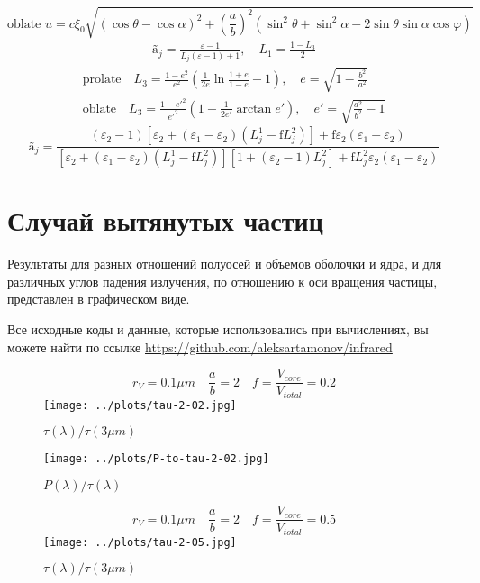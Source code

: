\documentclass[a4paper,10pt]{article}
\begin{document}
\begin{equation}
  \text{oblate    } u=c\xi_0\sqrt{(\cos\theta-\cos\alpha)^2+\left(\frac{a}{b}\right)^{2}(\sin^2\theta+\sin^2\alpha-2\sin\theta\sin\alpha\cos\varphi)} 
\end{equation}
\begin{eqnarray}
 \text{\~{a}}_j = \frac{\varepsilon-1}{L_j(\varepsilon-1)+1},\quad L_1=\frac{1-L_3}{2}
\end{eqnarray}
\begin{eqnarray}
  \text{prolate}\quad L_3 = \frac{1-e^2}{e^2}\left(\frac{1}{2e}\ln\frac{1+e}{1-e}-1\right),\quad e=\sqrt{1-\frac{b^2}{a^2}}\\
  \text{oblate}\quad L_3 = \frac{1-e'^2}{e'^2}\left(1 - \frac{1}{2e'}\arctan{e'}\right),\quad e'=\sqrt{\frac{a^2}{b^2}-1}
\end{eqnarray}
\begin{equation}
 \text{\~{a}}_j = \frac{(\varepsilon_2-1)[\varepsilon_2+(\varepsilon_1-\varepsilon_2)(L^{1}_{j} - \text{\~{f}}L^2_j)]
	    +\text{\~{f}}\varepsilon_2(\varepsilon_1-\varepsilon_2)}
	    {[\varepsilon_2+(\varepsilon_1-\varepsilon_2)(L^{1}_{j} - \text{\~{f}}L^2_j)][1+(\varepsilon_2-1)L^2_j]+
	    \text{\~{f}}L^2_j\varepsilon_2(\varepsilon_1-\varepsilon_2)} 
\end{equation}
\section{Случай вытянутых частиц}
\par
Результаты для разных отношений полуосей и объемов оболочки и ядра, и для различных углов падения излучения,
по отношению к оси вращения частицы, представлен в графическом виде.
\par Все исходные коды и данные, которые использовались при вычислениях, вы можете найти по ссылке \url{https://github.com/aleksartamonov/infrared}


\begin{figure}[p]

$$r_V = 0.1 \mu m \quad \frac{a}{b} = 2 \quad f=\frac{V_{core}}{V_{total}}=0.2$$
 \texttt{[image: ../plots/tau-2-02.jpg]}
 \caption{$\tau(\lambda)/\tau(3\mu m)$ }
\end{figure}

\begin{figure}[p]
 \texttt{[image: ../plots/P-to-tau-2-02.jpg]}
 \caption{$P(\lambda)/\tau(\lambda)$ }
\end{figure}


\begin{figure}[p]
 $$r_V = 0.1 \mu m \quad \frac{a}{b} = 2 \quad f=\frac{V_{core}}{V_{total}}=0.5$$
 \texttt{[image: ../plots/tau-2-05.jpg]}
 \caption{$\tau(\lambda)/\tau(3\mu m)$ }
\end{figure}
\end{document}
